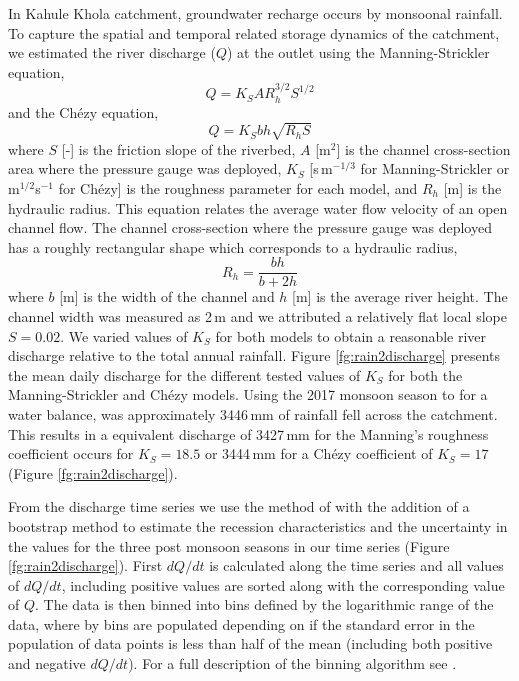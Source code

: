 \documentclass[hess, manuscript]{copernicus}
\begin{document}
In Kahule Khola catchment, groundwater recharge occurs by monsoonal rainfall. To capture the spatial and temporal related storage dynamics of the catchment, we estimated the river discharge ($Q$) at the outlet using the Manning-Strickler equation,
\begin{equation}
Q = K_{S}AR_{h}^{3/2}S^{1/2}
\end{equation}
and the Chézy equation,
\begin{equation}
Q = K_{S}bh \sqrt{R_{h}S}
\end{equation}
where $S$ [-] is the friction slope of the riverbed, $A$ [m$^{2}$] is the channel cross-section area where the pressure gauge was deployed, $K_{S}$ [s\,m$^{-1/3}$ for Manning-Strickler or m$^{1/2}$s$^{-1}$ for Chézy] is the roughness parameter for each model, and $R_{h}$ [m] is the hydraulic radius. This equation relates the average water flow velocity of an open channel flow. The channel cross-section where the pressure gauge was deployed has a roughly rectangular shape which corresponds to a hydraulic radius,
\begin{equation}
R_{h} = \frac{bh}{b + 2h}
\end{equation}
where $b$ [m] is the width of the channel and $h$ [m] is the average river height. The channel width was measured as 2\,m  and we attributed a relatively flat local slope $S=0.02$. We varied values of $K_{S}$ for both models to obtain a reasonable river discharge relative to the total annual rainfall. Figure \ref{fg:rain2discharge} presents the mean daily discharge for the different tested values of $K_{S}$ for both the Manning-Strickler and Chézy models. Using the 2017 monsoon season to for a water balance, was approximately 3446\,mm of rainfall fell across the catchment. This results in a equivalent discharge of 3427\,mm for the Manning’s roughness coefficient occurs for $K_{S}=18.5$ or 3444\,mm for a Chézy coefficient of $K_{S}=17$ (Figure \ref{fg:rain2discharge}).

From the discharge time series we use the method of \cite{kirchner-2009} with the addition of a bootstrap method to estimate the recession characteristics and the uncertainty in the values for the three post monsoon seasons in our time series (Figure \ref{fg:rain2discharge}). First $dQ/dt$ is calculated along the time series and all values of $dQ/dt$, including positive values are sorted along with the corresponding value of $Q$. The data is then binned into bins defined by the logarithmic range of the data, where by bins are populated depending on if the standard error in the population of data points is less than half of the mean (including both positive and negative $dQ/dt$). For a full description of the binning algorithm see \cite{kirchner-2009}. 
\end{document}
